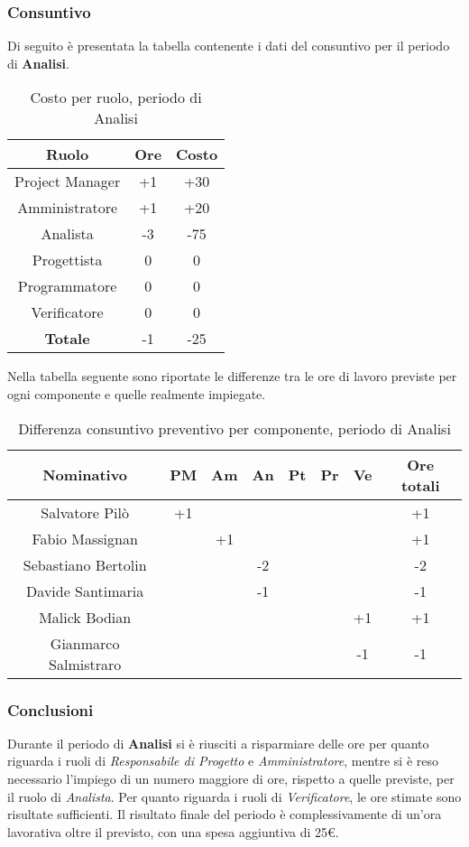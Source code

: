 	\subsubsection{Consuntivo}
	Di seguito è presentata la tabella contenente i dati del consuntivo per il periodo di \textbf{Analisi}.
	\begin{table}[H]
		\centering
		\begin{tabular}{|c|c|c|}
			\hline
			\textbf{Ruolo}		& \textbf{Ore}	& \textbf{Costo} \\
			\hline
			Project Manager		& +1		& +30	\\
			Amministratore		& +1		& +20	\\
			Analista			& -3		& -75	\\
			Progettista			& 0			& 0	\\
			Programmatore		& 0			& 0	\\
			Verificatore		& 0			& 0	\\
			\hline
			\textbf{Totale}		& -1		& -25	\\
			\hline
		\end{tabular}
		\caption{Costo per ruolo, periodo di Analisi}
	\end{table}
	Nella tabella seguente sono riportate le differenze tra le ore di lavoro previste per ogni componente e quelle realmente impiegate.
	\begin{table}[H]
		\centering
		\begin{tabular}{|c|c|c|c|c|c|c|c|}
			\hline
			\textbf{Nominativo}		& \textbf{PM}	& \textbf{Am}	& \textbf{An}	& \textbf{Pt}	& \textbf{Pr}	& \textbf{Ve}	& \textbf{Ore totali}     \\
			\hline
			Salvatore Pilò			& +1	& 		& 		&		&		&		& +1 \\
			Fabio Massignan			&		& +1	&		&		&		& 		& +1 \\
			Sebastiano Bertolin		&		& 	 	& -2	&		&		&		& -2 \\
			Davide Santimaria		&		& 		& -1	&		&		&		& -1 \\
			Malick Bodian			& 		&		&		&		&		& +1	& +1 \\
			Gianmarco Salmistraro	&		&		& 	 	&		&		& -1	& -1 \\
			\hline
		\end{tabular}
		\caption{Differenza consuntivo preventivo per componente, periodo di Analisi}
	\end{table}
	\subsubsection{Conclusioni}
	Durante il periodo di \textbf{Analisi} si è riusciti a risparmiare delle ore per quanto riguarda i ruoli di \textit{Responsabile di Progetto} e \textit{Amministratore}, mentre si è reso necessario l'impiego di un numero maggiore di ore, rispetto a quelle previste, per il ruolo di \textit{Analista}. Per quanto riguarda i ruoli di \textit{Verificatore}, le ore stimate sono risultate sufficienti. Il risultato finale del periodo è complessivamente di un'ora lavorativa oltre il previsto, con una spesa aggiuntiva di 25€.